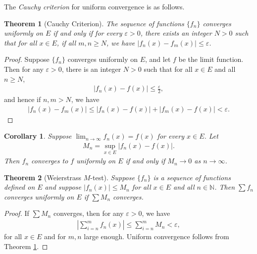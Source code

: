 \documentclass[11pt]{book}
\newtheorem{theorem}{Theorem}[chapter]
\newtheorem{corollary}{Corollary}[theorem]
\theoremstyle{definition}
\numberwithin{equation}{chapter}
\begin{document}
\medskip

The {\em Cauchy criterion} for uniform convergence is as follows.

\medskip

\begin{theorem}[Cauchy Criterion]\label{th_61}
The sequence of functions $\{f_n\}$ converges uniformly on $E$ if and only if for every $\varepsilon > 0$, there exists an integer $N > 0$ such that for all $x \in E$, if all $m,n \geq N$, we have $\left|f_n(x) - f_m(x)\right| \leq \varepsilon$.
\end{theorem}
\begin{proof}
Suppose $\{f_n\}$ converges uniformly on $E$, and let $f$ be the limit function. Then for any $\varepsilon > 0$, there is an integer $N > 0$ such that for all $x \in E$ and all $n \geq N$,
\begin{align*}
    \left|f_n(x) - f(x)\right| \leq \frac{\varepsilon}{2},
\end{align*}
and hence if $n,m > N$, we have
\begin{align*}
    \left|f_n(x) - f_m(x)\right| \leq \left|f_n(x) - f(x)\right| + \left|f_m(x) - f(x)\right| < \varepsilon.
\end{align*}
\end{proof}

\medskip

\begin{corollary}\label{coro_611}
Suppose $\lim_{n\to\infty} f_n(x) = f(x)$ for every $x \in E$. Let
\begin{align*}
    M_n = \sup_{x \in E} \left|f_n(x) - f(x)\right|.
\end{align*}
Then $f_n$ converges to $f$ uniformly on $E$ if and only if $M_n \to 0$ as $n \to \infty$.
\end{corollary}

\medskip

\begin{theorem}[Weierstrass $M$-test]\label{th_62}
Suppose $\{f_n\}$ is a sequence of functions defined on $E$ and suppose $\left|f_n(x)\right| \leq M_n$ for all $x \in E$ and all $n \in \mathbb{N}$. Then $\sum f_n$ converges uniformly on $E$ if $\sum M_n$ converges. 
\end{theorem}
\begin{proof}
If $\sum M_n$ converges, then for any $\varepsilon > 0$, we have
\begin{align*}
    \left|\sum^m_{i=n} f_n(x)\right| \leq \sum^m_{i=n} M_n < \varepsilon,
\end{align*}
for all $x \in E$ and for $m,n$ large enough. Uniform convergence follows from Theorem \ref{th_61}.
\end{proof}
\end{document}
